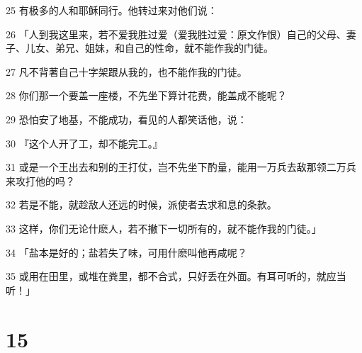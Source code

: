 \par 25 有极多的人和耶稣同行。他转过来对他们说：
\par 26 「人到我这里来，若不爱我胜过爱（爱我胜过爱：原文作恨）自己的父母、妻子、儿女、弟兄、姐妹，和自己的性命，就不能作我的门徒。
\par 27 凡不背著自己十字架跟从我的，也不能作我的门徒。
\par 28 你们那一个要盖一座楼，不先坐下算计花费，能盖成不能呢？
\par 29 恐怕安了地基，不能成功，看见的人都笑话他，说：
\par 30 『这个人开了工，却不能完工。』
\par 31 或是一个王出去和别的王打仗，岂不先坐下酌量，能用一万兵去敌那领二万兵来攻打他的吗？
\par 32 若是不能，就趁敌人还远的时候，派使者去求和息的条款。
\par 33 这样，你们无论什麽人，若不撇下一切所有的，就不能作我的门徒。」
\par 34 「盐本是好的；盐若失了味，可用什麽叫他再咸呢？
\par 35 或用在田里，或堆在粪里，都不合式，只好丢在外面。有耳可听的，就应当听！」

\chapter{15}

